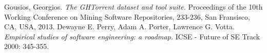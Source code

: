 \begin{thebibliography}{9}
Gousios, Georgios. \emph{The GHTorrent dataset and tool suite.} Proceedings of the 10th Working Conference on Mining Software Repositories, 233-236, San Fransisco, CA, USA, 2013.
Dewayne E. Perry, Adam A. Porter, Lawrence G. Votta. \emph{Empirical studies of software engineering: a roadmap.} ICSE - Future of SE Track 2000: 345-355.
\end{thebibliography}